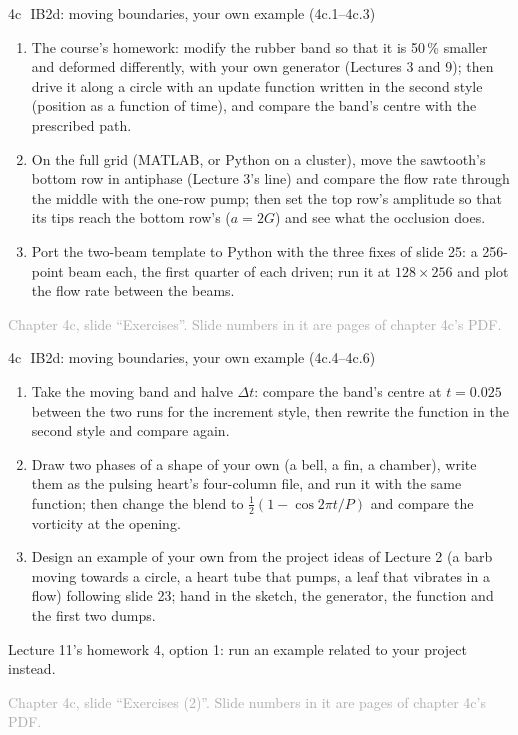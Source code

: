 \documentclass[aspectratio=169,11pt]{beamer}
\newcommand{\sourcecredit}[1]{\vfill\begin{flushright}\tiny\textcolor{DarkGray}{#1}\end{flushright}}
\begin{document}
\begin{frame}{4c\,\textbullet\ IB2d: moving boundaries, your own example (4c.1--4c.3)}
\label{fr:c4cx1}
\small
\begin{enumerate}
  \item[4c.1] The course's homework: modify the rubber band so that it is 50\,\% smaller and deformed differently, with your own generator (Lectures 3 and 9); then drive it along a circle with an update function written in the second style (position as a function of time), and compare the band's centre with the prescribed path.
  \item[4c.2] On the full grid (MATLAB, or Python on a cluster), move the sawtooth's bottom row in antiphase (Lecture 3's line) and compare the flow rate through the middle with the one-row pump; then set the top row's amplitude so that its tips reach the bottom row's ($a = 2G$) and see what the occlusion does.
  \item[4c.3] Port the two-beam template to Python with the three fixes of slide 25: a 256-point beam each, the first quarter of each driven; run it at $128 \times 256$ and plot the flow rate between the beams.
\end{enumerate}
\sourcecredit{Chapter 4c, slide ``Exercises''. Slide numbers in it are pages of chapter 4c's PDF.}
\end{frame}

\begin{frame}{4c\,\textbullet\ IB2d: moving boundaries, your own example (4c.4--4c.6)}
\label{fr:c4cx4}
\small
\begin{enumerate}
  
  \item[4c.4] Take the moving band and halve $\Delta t$: compare the band's centre at $t = 0.025$ between the two runs for the increment style, then rewrite the function in the second style and compare again.
  \item[4c.5] Draw two phases of a shape of your own (a bell, a fin, a chamber), write them as the pulsing heart's four-column file, and run it with the same function; then change the blend to $\frac12(1 - \cos 2\pi t/P)$ and compare the vorticity at the opening.
  \item[4c.6] Design an example of your own from the project ideas of Lecture 2 (a barb moving towards a circle, a heart tube that pumps, a leaf that vibrates in a flow) following slide 23; hand in the sketch, the generator, the function and the first two dumps.
\end{enumerate}
 Lecture 11's homework 4, option 1: run an example related to your project instead.
\sourcecredit{Chapter 4c, slide ``Exercises (2)''. Slide numbers in it are pages of chapter 4c's PDF.}
\end{frame}
\end{document}

